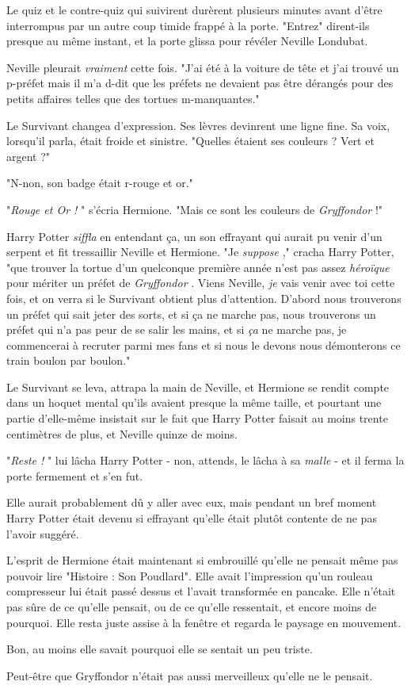 Le quiz et le contre-quiz qui suivirent durèrent plusieurs minutes avant d'être interrompus par un autre coup timide frappé à la porte. "Entrez" dirent-ils presque au même instant, et la porte glissa pour révéler Neville Londubat.

Neville pleurait \emph{vraiment}  cette fois. "J'ai été à la voiture de tête et j'ai trouvé un p-préfet mais il m'a d-dit que les préfets ne devaient pas être dérangés pour des petits affaires telles que des tortues m-manquantes."

Le Survivant changea d'expression. Ses lèvres devinrent une ligne fine. Sa voix, lorsqu'il parla, était froide et sinistre. "Quelles étaient ses couleurs ? Vert et argent ?"

"N-non, son badge était r-rouge et or."

"\emph{Rouge et Or !} " s'écria Hermione. "Mais ce sont les couleurs de \emph{Gryffondor}  !"

Harry Potter \emph{siffla}  en entendant ça, un son effrayant qui aurait pu venir d'un serpent et fit tressaillir Neville et Hermione. "Je \emph{suppose} ," cracha Harry Potter, "que trouver la tortue d'un quelconque première année n'est pas assez \emph{héroïque}  pour mériter un préfet de \emph{Gryffondor} . Viens Neville, \emph{je}  vais venir avec toi cette fois, et on verra si le Survivant obtient plus d'attention. D'abord nous trouverons un préfet qui sait jeter des sorts, et si ça ne marche pas, nous trouverons un préfet qui n'a pas peur de se salir les mains, et si \emph{ça}  ne marche pas, je commencerai à recruter parmi mes fans et si nous le devons nous démonterons ce train boulon par boulon."

Le Survivant se leva, attrapa la main de Neville, et Hermione se rendit compte dans un hoquet mental qu'ils avaient presque la même taille, et pourtant une partie d'elle-même insistait sur le fait que Harry Potter faisait au moins trente centimètres de plus, et Neville quinze de moins.

"\emph{Reste !} " lui lâcha Harry Potter - non, attends, le lâcha à sa \emph{malle}  - et il ferma la porte fermement et s'en fut.

Elle aurait probablement dû y aller avec eux, mais pendant un bref moment Harry Potter était devenu si effrayant qu'elle était plutôt contente de ne pas l'avoir suggéré.

L'esprit de Hermione était maintenant si embrouillé qu'elle ne pensait même pas pouvoir lire "Histoire : Son Poudlard". Elle avait l'impression qu'un rouleau compresseur lui était passé dessus et l'avait transformée en pancake. Elle n'était pas sûre de ce qu'elle pensait, ou de ce qu'elle ressentait, et encore moins de pourquoi. Elle resta juste assise à la fenêtre et regarda le paysage en mouvement.

Bon, au moins elle savait pourquoi elle se sentait un peu triste.

Peut-être que Gryffondor n'était pas aussi merveilleux qu'elle ne le pensait.

